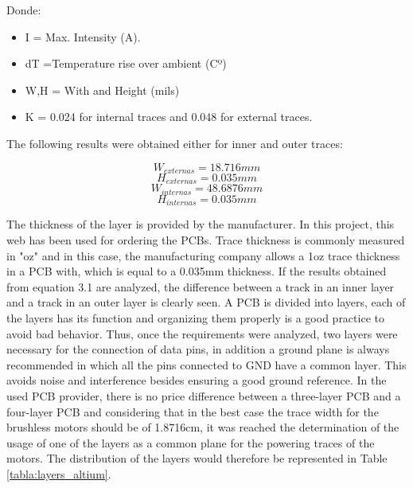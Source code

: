 Donde: 
\begin{itemize}
	\item I = Max. Intensity (A).
	\item dT =Temperature rise over ambient (Cº)
	\item W,H = With and Height (mils)
	\item K = 0.024 for internal traces and 0.048 for external traces.
\end{itemize}

The following results were obtained either for inner and outer traces:

\begin{equation*}
W_{externas} = 18.716 mm 
\end{equation*} 
\begin{equation*}
H_{externas} = 	0.035 mm
\end{equation*}
\begin{equation*}
W_{internas} =  48.6876 mm 
\end{equation*} 
\begin{equation*}
H_{internas} = 	0.035 mm
\end{equation*}

The thickness of the layer is provided by the manufacturer. In this project, this web has been used for ordering the PCBs. \newline 
Trace thickness is commonly measured in "oz" and in this case, the manufacturing company allows a 1oz trace thickness in a PCB with, which is equal to a 0.035mm thickness.\newline
If the results obtained from equation 3.1 are analyzed, the difference between a track in an inner layer and a track in an outer layer is clearly seen.\newline
A PCB is divided into layers, each of the layers has its function and organizing them properly is a good practice to avoid bad behavior. Thus, once the requirements were analyzed, two layers were necessary for the connection of data pins, in addition a ground plane is always recommended in which all the pins connected to GND have a common layer. This avoids noise and interference besides ensuring a good ground reference. \newline
In the used PCB provider, there is no price difference between a three-layer PCB and a four-layer PCB and considering that in the best case the trace width for the brushless motors should be of 1.8716cm, it was reached the determination of the usage of one of the layers as a common plane for the powering traces of the motors. The distribution of the layers would therefore be represented in Table \ref{tabla:layers_altium}.

